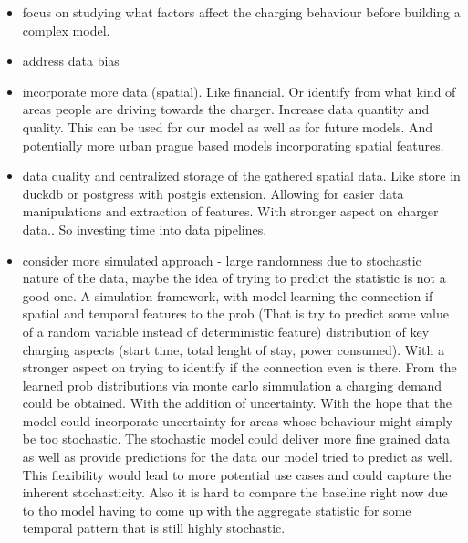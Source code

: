 \begin{itemize}
    \item focus on studying what factors affect the charging behaviour before building a complex model.
    \item address data bias
    \item incorporate more data (spatial). Like financial. Or identify from what kind of areas people are driving towards the charger. Increase data quantity and quality. This can be used for our model as well as for future models. And potentially more urban prague based models incorporating spatial features.
    \item data quality and centralized storage of the gathered spatial data. Like store in duckdb or postgress with postgis extension. Allowing for easier data manipulations and extraction of features. With stronger aspect on charger data.. So investing time into data pipelines.
    \item consider more simulated approach - large randomness due to stochastic nature of the data, maybe the idea of trying to predict the statistic is not a good one. A simulation framework, with model learning the connection if spatial and temporal features to the prob (That is try to predict some value of a random variable instead of deterministic feature) distribution  of key charging aspects (start time, total lenght of stay, power consumed). With a stronger aspect on trying to identify if the connection even is there. From the learned prob distributions via monte carlo simmulation a charging demand could be obtained. With the addition of uncertainty. With the hope that the model could incorporate uncertainty for areas whose behaviour might simply be too stochastic. The stochastic model could deliver more fine grained data as well as provide predictions for the data our model tried to predict as well. This flexibility would lead to more potential use cases and could capture the inherent stochasticity. Also it is hard to compare the baseline right now due to tho model having to come up with the aggregate statistic for some temporal pattern that is still highly stochastic.
\end{itemize}

